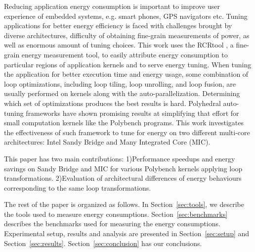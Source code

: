 Reducing application energy consumption is important to improve user experience of 
embedded systems, e.g. smart phones, GPS navigators etc. 
Tuning applications for better energy efficiency is faced with challenges brought by
diverse architectures, difficulty of obtaining fine-grain measurements of power, 
as well as enormous amount of tuning choices.
This work uses the RCRtool \cite{us}, a fine-grain energy measurement tool, to easily attribute energy consumption to particular
regions of application kernels and to serve energy tuning. 
When tuning the application for
better execution time and energy usage, some combination of loop optimizations, including loop 
tiling, loop unrolling, and loop fusion, are usually performed on kernels along with the auto-parallelization.
Determining which set of optimizations produces the best results is hard.
Polyhedral auto-tuning frameworks have shown promising results at simplifying that effort\cite{EJ2012}
for small computation kernels like the Polybench programs. 
This work investigates the effectiveness of such framework to tune for 
energy on two different multi-core architectures: Intel Sandy Bridge
and Many Integrated Core (MIC).
 
This paper has two main contributions: 
1)Performance speedups and energy savings on Sandy Bridge and MIC for 
various Polybench kernels applying loop transformations. 
2)Evaluation of architectural differences of energy behaviours corresponding to the same loop transformations.

The rest of the paper is organized as follows. In Section~\ref{sec:tools}, we describe the tools
used to measure energy consumptions. Section~\ref{sec:benchmarks} describes the benchmarks used for  
measuring the energy consumptions. Experimental setup, results and analysis are presented in Section~\ref{sec:setup} and Section~\ref{sec:results}. Section~\ref{sec:conclusion} has our conclusions.

